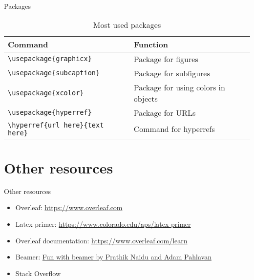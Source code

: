 \begin{frame}{Packages}
\begin{table}[]
    \centering
    \begin{footnotesize}
    \begin{tabular}{|l|l|}
    \hline
     Command & Function \\
      \hline
     \texttt{\textbackslash usepackage\{graphicx\}} & Package for figures\\
     \hline
   \texttt{\textbackslash usepackage\{subcaption\}} & Package for subfigures\\
   \hline
   \texttt{\textbackslash usepackage\{xcolor\}} & Package for using colors in objects\\
   \hline
   \texttt{\textbackslash usepackage\{hyperref\}} & Package for URLs\\
   \texttt{\textbackslash hyperref\{url here\}\{text here\}} & Command for hyperrefs\\
   \hline
    \end{tabular}
    \end{footnotesize}
    \caption{Most used packages}
    \label{tab:syntax03}
\end{table}

\end{frame}

\section{Other resources}
\label{sec:resources}
\frame[plain]{\sectionpage}

\begin{frame}{Other resources}
\begin{itemize}
    \item Overleaf: \href{https://www.overleaf.com}{https://www.overleaf.com}
    \item Latex primer: \href{https://www.colorado.edu/aps/latex-primer}{https://www.colorado.edu/aps/latex-primer} 
    \item Overleaf documentation: \href{https://www.overleaf.com/learn}{https://www.overleaf.com/learn}
    \item Beamer: \href{https://www.google.com/url?sa=t&source=web&rct=j&opi=89978449&url=https://web.mit.edu/rsi/www/pdfs/beamer-tutorial.pdf&ved=2ahUKEwi_ioOB7taFAxXBI0QIHVGcDU4QFnoECBcQAQ&usg=AOvVaw0jHOs8KPLsmYjkpyqf2XM8}{Fun with beamer by Prathik Naidu and Adam Pahlavan}
    \item Stack Overflow
\end{itemize}
    
\end{frame}